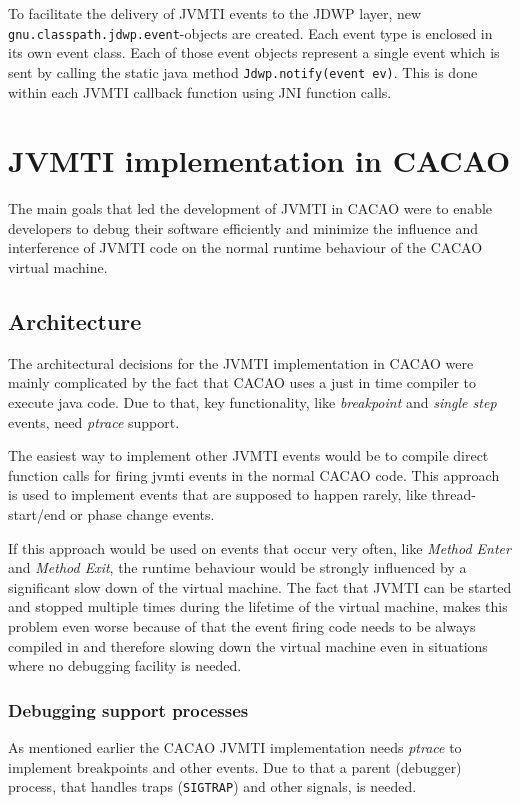 To facilitate the delivery of JVMTI events to the JDWP layer, new \texttt{gnu.classpath.jdwp.event}-objects are created. Each event type is enclosed in its own event class.  Each of those event objects represent a single event which is sent by calling the static java method \texttt{Jdwp.notify(event ev)}. This is done within each JVMTI callback function using JNI function calls.



\section{JVMTI implementation in CACAO} %

The main goals that led the development of JVMTI in CACAO were to enable developers to debug their software efficiently and minimize the influence and interference of JVMTI code on the normal runtime behaviour of the CACAO virtual machine.

\subsection{Architecture} %

The architectural decisions for the JVMTI implementation in CACAO were mainly complicated by the fact that CACAO uses a just in time compiler to execute java code. Due to that, key functionality, like \textit{breakpoint} and \textit{single step} events, need \textit{ptrace}\cite{ptrace} support.

The easiest way to implement other JVMTI events would be to compile direct function calls for firing jvmti events in the normal CACAO code. This approach is used to implement events that are supposed to happen rarely, like thread-start/end or phase change events.

If this approach would be used on events that occur very often, like \textit{Method Enter} and \textit{Method Exit}, the runtime behaviour would be strongly influenced by a significant slow down of the virtual machine. The fact that JVMTI can be started and stopped multiple times during the lifetime of the virtual machine, makes this problem even worse because of that the event firing code needs to be always compiled in and therefore slowing down the virtual machine even in situations where no debugging facility is needed.

\subsubsection{Debugging support processes}
As mentioned earlier the CACAO JVMTI implementation needs \textit{ptrace} to implement breakpoints and other events. Due to that a parent (debugger) process, that handles traps (\texttt{SIGTRAP}) and other signals, is needed. 

